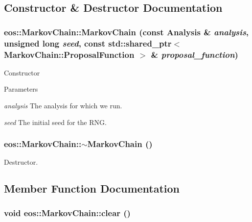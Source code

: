 \subsection{Constructor \& Destructor Documentation}
\hypertarget{classeos_1_1MarkovChain_a47726a7176a818738c426b532e88ba94}{
\subsubsection[{MarkovChain}]{\setlength{\rightskip}{0pt plus 5cm}eos::MarkovChain::MarkovChain (const {\bf Analysis} \& {\em analysis}, \/  unsigned long {\em seed}, \/  const std::shared\_\-ptr$<$ {\bf MarkovChain::ProposalFunction} $>$ \& {\em proposal\_\-function})}}
\label{classeos_1_1MarkovChain_a47726a7176a818738c426b532e88ba94}
Constructor


\begin{DoxyParams}{Parameters}
\item[{\em analysis}]The analysis for which we run. \item[{\em seed}]The initial seed for the RNG. \end{DoxyParams}
\hypertarget{classeos_1_1MarkovChain_afc27e695a24e780cd1af87e454588f31}{
\subsubsection[{$\sim$MarkovChain}]{\setlength{\rightskip}{0pt plus 5cm}eos::MarkovChain::$\sim$MarkovChain ()}}
\label{classeos_1_1MarkovChain_afc27e695a24e780cd1af87e454588f31}


Destructor. 

\subsection{Member Function Documentation}
\hypertarget{classeos_1_1MarkovChain_af4eb1b21be84a13ae5f421fe49ed9373}{
\subsubsection[{clear}]{\setlength{\rightskip}{0pt plus 5cm}void eos::MarkovChain::clear ()}}
\label{classeos_1_1MarkovChain_af4eb1b21be84a13ae5f421fe49ed9373}


